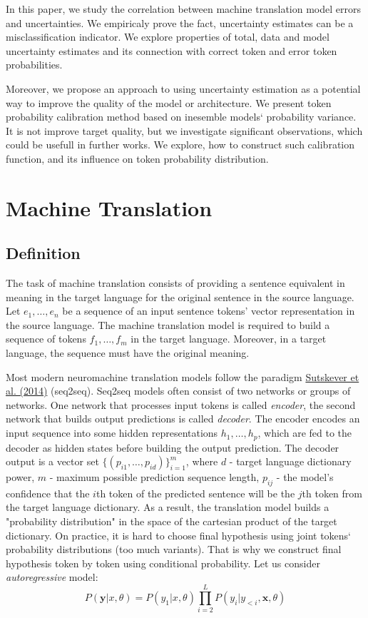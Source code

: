 \documentclass[a4paper,14pt]{extarticle}
\newcommand{\bibref}[3]{\hyperlink{#1}{#2 (#3)}}
\begin{document}
	In this paper, we study the correlation between machine translation model errors and uncertainties. We empiricaly prove the fact, uncertainty estimates can be a misclassification indicator. We explore properties of total, data and model uncertainty estimates and its connection with correct token and error token probabilities.
	
	Moreover, we propose an approach to using uncertainty estimation as a potential way to improve the quality of the model or architecture. We present token probability calibration method based on inesemble models` probability variance. It is not improve target quality, but we investigate significant observations, which could be usefull in further works. We explore, how to construct such calibration function, and its influence on token probability distribution. 
	\section{Machine Translation}
	\subsection{Definition}
		The task of machine translation consists of providing a sentence equivalent in meaning in the target language for the original sentence in the source language. Let $e_1, \dots, e_n$ be a sequence of an input sentence tokens' vector representation in the source language. The machine translation model is required to build a sequence of tokens $f_1, \dots, f_m$ in the target language. Moreover, in a target language, the sequence must have the original meaning.
	
	Most modern neuromachine translation models follow the paradigm \bibref{seq2seq}{Sutskever et al.}{2014} (seq2seq). Seq2seq models often consist of two networks or groups of networks. One network that processes input tokens is called \textit{encoder}, the second network that builds output predictions is called \textit{decoder}. The encoder encodes an input sequence into some hidden representations $h_1, \dots, h_p$, which are fed to the decoder as hidden states before building the output prediction. The decoder output is a vector set $\{(p_{i1}, \dots, p_{id})\}_{i=1}^{m}$, where $d$ - target language dictionary power, $m$ - maximum possible prediction sequence length, $p_{ij}$ - the model's confidence that the $i$th token of the predicted sentence will be the $j$th token from the target language dictionary. As a result, the translation model builds a "probability distribution" in the space of the cartesian product of the target dictionary. On practice, it is hard to choose final hypothesis using joint tokens` probability distributions (too much variants). That is why we construct final hypothesis token by token using conditional probability. Let us consider \textit{autoregressive} model:
	\begin{equation}
		P(\textbf{y} | x, \theta) = P(y_1 | x, \theta) \prod_{i=2}^{L} P(y_i | y_{<i}, \textbf{x}, \theta)
		\label{eqn:autoregressive}
	\end{equation}
	
\end{document}
